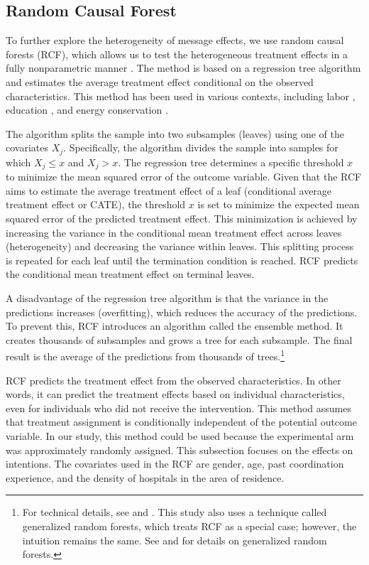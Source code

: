 \documentclass[
  11pt,
  a4paper
]{article}
\begin{document}
\hypertarget{rcf}{%
\subsection{Random Causal Forest}\label{rcf}}

To further explore the heterogeneity of message effects, we use random causal forests (RCF), which allows us to test the heterogeneous treatment effects in a fully nonparametric manner \citep{Athey2016, Wager2018}. The method is based on a regression tree algorithm and estimates the average treatment effect conditional on the observed characteristics. This method has been used in various contexts, including labor \citep{Davis2017}, education \citep{Carlana2022}, and energy conservation \citep{Murakami2022}.

The algorithm splits the sample into two subsamples (leaves) using one of the covariates \(X_j\). Specifically, the algorithm divides the sample into samples for which \(X_j \le x\) and \(X_j > x\). The regression tree determines a specific threshold \(x\) to minimize the mean squared error of the outcome variable. Given that the RCF aims to estimate the average treatment effect of a leaf (conditional average treatment effect or CATE), the threshold \(x\) is set to minimize the expected mean squared error of the predicted treatment effect. This minimization is achieved by increasing the variance in the conditional mean treatment effect across leaves (heterogeneity) and decreasing the variance within leaves. This splitting process is repeated for each leaf until the termination condition is reached. RCF predicts the conditional mean treatment effect on terminal leaves.

A disadvantage of the regression tree algorithm is that the variance in the predictions increases (overfitting), which reduces the accuracy of the predictions. To prevent this, RCF introduces an algorithm called the ensemble method. It creates thousands of subsamples and grows a tree for each subsample. The final result is the average of the predictions from thousands of trees.\footnote{For technical details, see \citet{Athey2016} and \citet{Wager2018}. This study also uses a technique called generalized random forests, which treats RCF as a special case; however, the intuition remains the same. See \citet{Athey2019} and \citet{Athey2019a} for details on generalized random forests.}

RCF predicts the treatment effect from the observed characteristics. In other words, it can predict the treatment effects based on individual characteristics, even for individuals who did not receive the intervention. This method assumes that treatment assignment is conditionally independent of the potential outcome variable. In our study, this method could be used because the experimental arm was approximately randomly assigned. This subsection focuses on the effects on intentions. The covariates used in the RCF are gender, age, past coordination experience, and the density of hospitals in the area of residence.
\end{document}
